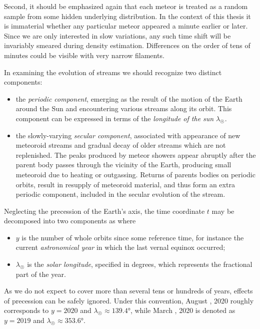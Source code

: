         Second, it should be emphasized again that each meteor is treated
        as a random sample from some hidden underlying distribution.
        In the context of this thesis it is immaterial whether any particular meteor
        appeared a minute earlier or later. Since we are only interested in slow variations,
        any such time shift will be invariably smeared during density estimation.
        Differences on the order of tens of minutes could be visible with very narrow filaments.

        In examining the evolution of streams we should recognize two distinct components:
        \begin{itemize}
            \item the \emph{periodic component}, emerging as the result of the motion of the Earth
                around the Sun and encountering various streams along its orbit.
                This component can be expressed in terms of the \emph{longitude of the sun} $\lambda_\Sun$.

            \item the slowly-varying \emph{secular component}, associated with appearance of new meteoroid
                streams and gradual decay of older streams which are not replenished.
                The peaks produced by meteor showers appear abruptly after the parent body passes through the vicinity of the Earth,
                producing small meteoroid due to heating or outgassing.
                Returns of parents bodies on periodic orbits, result in resupply of meteoroid material,
                and thus form an extra periodic component, included in the secular evolution of the stream.
        \end{itemize}

        Neglecting the precession of the Earth's axis, the time coordinate $t$ may be decomposed into two components as
        where
        \begin{itemize}
            \item $y$ is the number of whole orbits since some reference time, for instance
                the current \emph{astronomical year} in which the last vernal equinox occurred;
            \item $\lambda_\Sun$ is the \emph{solar longitude}, specified in degrees, which represents the fractional part of the year.
        \end{itemize}

        As we do not expect to cover more than several tens or hundreds of years, effects of precession can be safely ignored.
        Under this convention, August , 2020 roughly corresponds to $y = 2020$ and $\lambda_\Sun \approx \ang{139.4}$,
        while March , 2020 is denoted as $y = 2019$ and $\lambda_\Sun \approx \ang{353.6}$.


